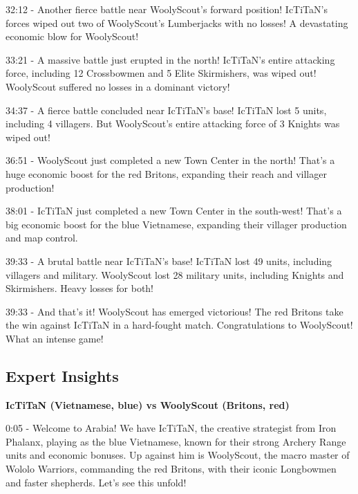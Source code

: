 32:12 - Another fierce battle near WoolyScout's forward position! IcTiTaN's forces wiped out two of WoolyScout's Lumberjacks with no losses! A devastating economic blow for WoolyScout! \par \vspace{1em}

33:21 - A massive battle just erupted in the north! IcTiTaN's entire attacking force, including 12 Crossbowmen and 5 Elite Skirmishers, was wiped out! WoolyScout suffered no losses in a dominant victory! \par \vspace{1em}

34:37 - A fierce battle concluded near IcTiTaN's base! IcTiTaN lost 5 units, including 4 villagers. But WoolyScout's entire attacking force of 3 Knights was wiped out! \par \vspace{1em}

36:51 - WoolyScout just completed a new Town Center in the north! That's a huge economic boost for the red Britons, expanding their reach and villager production! \par \vspace{1em}

38:01 - IcTiTaN just completed a new Town Center in the south-west! That's a big economic boost for the blue Vietnamese, expanding their villager production and map control. \par \vspace{1em}

39:33 - A brutal battle near IcTiTaN's base! IcTiTaN lost 49 units, including villagers and military. WoolyScout lost 28 military units, including Knights and Skirmishers. Heavy losses for both! \par \vspace{1em}

39:33 - And that's it! WoolyScout has emerged victorious! The red Britons take the win against IcTiTaN in a hard-fought match. Congratulations to WoolyScout! What an intense game! \par \vspace{1em}

\subsection{Expert Insights}
\textbf{IcTiTaN (Vietnamese, blue) vs WoolyScout (Britons, red)}

0:05 - Welcome to Arabia! We have IcTiTaN, the creative strategist from Iron Phalanx, playing as the blue Vietnamese, known for their strong Archery Range units and economic bonuses. Up against him is WoolyScout, the macro master of Wololo Warriors, commanding the red Britons, with their iconic Longbowmen and faster shepherds. Let's see this unfold! \par \vspace{1em}

